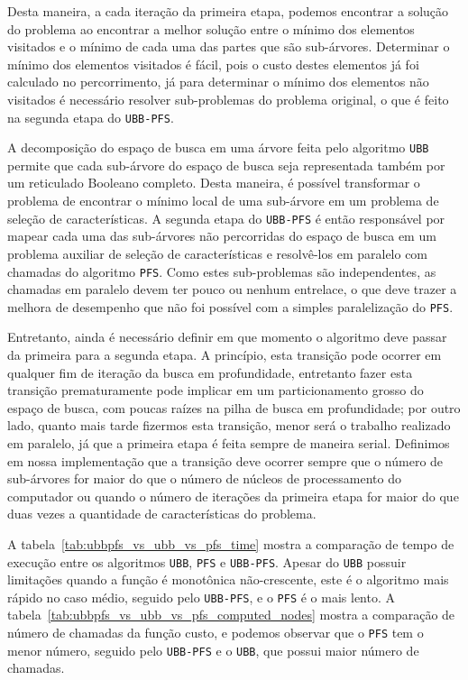 \documentclass[12pt]{article}
\newcommand{\algname}[1]{\texttt{#1}}
\begin{document}
Desta maneira, a cada iteração da primeira etapa, podemos encontrar a
solução do problema ao encontrar a melhor solução entre o mínimo dos
elementos visitados e o mínimo de cada uma das partes que são 
sub-árvores. Determinar o mínimo dos elementos visitados é fácil, pois
o custo destes elementos já foi calculado no percorrimento, já
para determinar o mínimo dos elementos não visitados é necessário 
resolver sub-problemas do problema original, o que é feito na segunda
etapa do \algname{UBB-PFS}.

A decomposição do espaço de busca em uma árvore feita pelo algoritmo
\algname{UBB} permite que cada sub-árvore do espaço de busca seja
representada também por um reticulado Booleano completo. Desta maneira,
é possível transformar o problema de encontrar o mínimo local  de uma 
sub-árvore em um problema de seleção de características. A segunda etapa 
do \algname{UBB-PFS} é então responsável por mapear cada uma das 
sub-árvores não percorridas do espaço de busca em um problema auxiliar
de seleção de características e resolvê-los em paralelo com chamadas
do algoritmo \algname{PFS}. Como estes sub-problemas são independentes,
as chamadas em paralelo devem ter pouco ou nenhum entrelace, o que deve
trazer a melhora de desempenho que não foi possível com a simples 
paralelização do \algname{PFS}.

Entretanto, ainda é necessário definir em que momento o algoritmo deve
passar da primeira para a segunda etapa. A princípio, esta transição
pode ocorrer em qualquer fim de iteração da busca em profundidade, 
entretanto fazer esta transição prematuramente pode implicar em um 
particionamento grosso do espaço de busca, com poucas raízes na pilha
de busca em profundidade; por outro lado, quanto mais tarde fizermos 
esta transição, menor será o trabalho realizado em paralelo, já que a
primeira etapa  é feita sempre de maneira serial. Definimos em nossa 
implementação que a transição deve ocorrer sempre que o número de 
sub-árvores for maior do que o número de núcleos de processamento do 
computador ou quando o número de iterações da primeira etapa for maior
do que duas vezes a quantidade de características do problema.

A tabela~\ref{tab:ubbpfs_vs_ubb_vs_pfs_time} mostra a comparação de 
tempo de execução entre os algoritmos \algname{UBB}, \algname{PFS} e
\algname{UBB-PFS}. Apesar do \algname{UBB} possuir limitações quando
a função é monotônica não-crescente, este é o algoritmo mais rápido
no caso médio, seguido pelo \algname{UBB-PFS}, e o \algname{PFS} é o 
mais lento. A tabela~\ref{tab:ubbpfs_vs_ubb_vs_pfs_computed_nodes} 
mostra a comparação de número de chamadas da função custo, e podemos
observar que o \algname{PFS} tem o menor número, seguido pelo 
\algname{UBB-PFS} e o \algname{UBB}, que possui maior número de 
chamadas.
\end{document}

